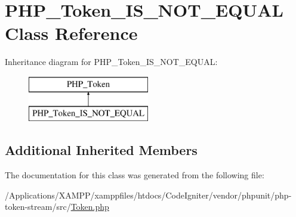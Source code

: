 \hypertarget{class_p_h_p___token___i_s___n_o_t___e_q_u_a_l}{}\section{P\+H\+P\+\_\+\+Token\+\_\+\+I\+S\+\_\+\+N\+O\+T\+\_\+\+E\+Q\+U\+AL Class Reference}
\label{class_p_h_p___token___i_s___n_o_t___e_q_u_a_l}
Inheritance diagram for P\+H\+P\+\_\+\+Token\+\_\+\+I\+S\+\_\+\+N\+O\+T\+\_\+\+E\+Q\+U\+AL\+:\begin{figure}[H]
\begin{center}
\leavevmode
\includegraphics[height=2.000000cm]{class_p_h_p___token___i_s___n_o_t___e_q_u_a_l}
\end{center}
\end{figure}
\subsection*{Additional Inherited Members}


The documentation for this class was generated from the following file\+:\begin{DoxyCompactItemize}
\item 
/\+Applications/\+X\+A\+M\+P\+P/xamppfiles/htdocs/\+Code\+Igniter/vendor/phpunit/php-\/token-\/stream/src/\mbox{\hyperlink{_token_8php}{Token.\+php}}\end{DoxyCompactItemize}
